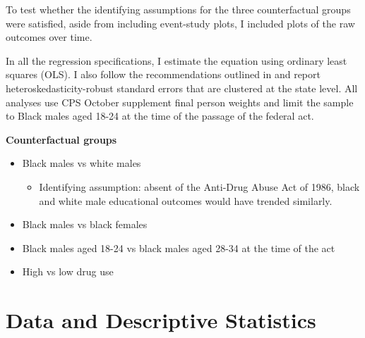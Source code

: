 \documentclass{article}
\begin{document}
To test whether the identifying assumptions for the three counterfactual groups were satisfied, aside from including event-study plots, I included plots of the raw outcomes over time.

In all the regression specifications, I estimate the equation using ordinary least squares (OLS). I also follow the recommendations outlined in \cite{duflo_did} and report heteroskedasticity-robust standard errors that are clustered at the state level. All analyses use CPS October supplement final person weights and limit the sample to Black males aged 18-24 at the time of the passage of the federal act.

\textbf{Counterfactual groups}
\begin{itemize}[itemsep=0.05mm, parsep=0pt]
  \item Black males vs white males
  \begin{itemize}
    \item Identifying assumption: absent of the Anti-Drug Abuse Act of 1986, black and white male educational outcomes would have trended similarly.
  \end{itemize}
  \item Black males vs black females
  \item Black males aged 18-24 vs black males aged 28-34 at the time of the act
  \item High vs low drug use
\end{itemize}


\section{Data and Descriptive Statistics}
\end{document}
